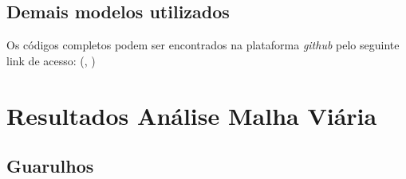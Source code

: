 \section{Demais modelos utilizados}


Os códigos completos podem ser encontrados na plataforma \textit{github} pelo seguinte link de acesso: (, \citeyear{guilherme_fernandes_alves_2022_6792977})

\chapter{Resultados Análise Malha Viária}\label{sec:appResultMalha}


\section{Guarulhos}

